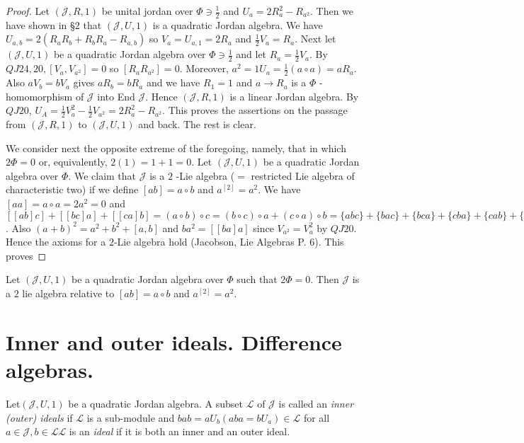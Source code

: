 \begin{proof}
Let $(\mathscr{J},R,1)$ be unital jordan over $\Phi\ni\frac{1}{2}$ and
$U_a=2R_a^{2}-R_{a^{2}}$. Then we have shown in \S $2$ that
$(\mathscr{J},U,1)$ is a quadratic Jordan algebra. We have
$U_{a,b}=2(R_aR_b+R_bR_a-R_{a,b})$ so $V_a=U_{a,1}=2R_a$ and
$\frac{1}{2}V_a=R_a$. Next let $(\mathscr{J},U,1)$ be a quadratic
Jordan algebra over $\Phi\ni\frac{1}{2}$ and let
$R_a=\frac{1}{2}V_a$. By $QJ 24, 20, [V_a,V_{a^{2}}]=0$ so
$[R_aR_{a^{2}}]=0$. Moreover, $a^{2}=1U_a=\frac{1}{2}(a\circ
a)=aR_a$. Also $aV_b=bV_a$ gives $aR_b=bR_a$ and we have $R_1=1$ and
$a\to R_a$ is a $\Phi$ -homomorphism of $\mathscr{J}$ into End
$\mathscr{J}$. Hence $(\mathscr{J},R,1)$ is a linear Jordan
algebra. By $QJ 20$,
$U_A=\frac{1}{2}V^{2}_a-\frac{1}{2}V_{a^{2}}=2R_a^{2}-R_{a^{2}}$. This
proves the assertions on the passage from $(\mathscr{J},R,1)$ to
$(\mathscr{J},U,1)$ and back. The rest is clear. 

We consider next the opposite extreme of the foregoing, namely, that
in which $2\Phi =0$ or, equivalently, $2(1)=1+1=0$. Let
$(\mathscr{J},U,1)$ be a quadratic Jordan algebra over $\Phi$. We
claim that $\mathscr{J}$ is a $2$ -Lie algebra ($=$ restricted Lie
algebra of characteristic two) if we define $[ab]=a\circ b$ and
$a^{[2]}=a^{2}$. We have $[aa]=a\circ a=2a^{2}=0$ and
$[[ab]c]+[[bc]a]+[[ca]b]=(a\circ b)\circ c =(b \circ c)\circ a+(c\circ
a)\circ b=\{abc\}+\{bac\}+\{bca\}+\{cba\}+\{cab\}+\{acb\} (QJ
27)=2\{abc\}+2\{bca\}+2\{cab\}=0$. Also $(a+b)^{2}=a^{2}+b^{2}+[a,b]$
and $ba^{2}=[[ba]a]$ since $V_{a^{2}}=V^{2}_a$ by $QJ 20$. Hence the
axioms for a $2$-Lie algebra hold (Jacobson, Lie Algebras
P. $6$). This proves 
\end{proof}

\begin{thm}\label{c1:thm4}
  Let $(\mathscr{J},U,1)$ be a quadratic Jordan algebra over $\Phi$
  such that $2\Phi =0$. Then $\mathscr{J}$ is a $2$ lie algebra
  relative to $[ab]=a\circ b$ and $a^{[2]}=a^{2}$. 
\end{thm}

\section{Inner and outer ideals. Difference algebras.}\label{c1:sec5}

\begin{defn}
  Let\pageoriginale $(\mathscr{J},U,1)$ be a quadratic Jordan
  algebra. A subset $\mathscr{L}$ of $\mathscr{J}$ is called an {\em
    inner (outer) ideals} if $\mathscr{L}$ is a sub-module and
  $bab=aU_b(aba=bU_a)\in \mathscr{L}$ for all $a\in \mathscr{J}, b\in
  \mathscr{L}\mathscr{L}$ is an {\em ideal} if it is both an inner and
  an outer ideal. 
\end{defn}

